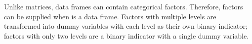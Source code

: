 \documentclass[article]{jss}
\begin{document}
Unlike matrices, data frames can contain categorical factors.
Therefore, factors can be supplied when  is a data
frame. Factors with multiple levels are transformed into dummy
variables with each level as their own binary
indicator; %
factors with only two levels are a binary indicator with a
single dummy variable.
\end{document}
